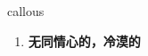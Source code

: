 
\begin{frame}
{\huge callous}
\begin{center}
\begin{enumerate}\Large
  \item \textbf{无同情心的，冷漠的}
\end{enumerate}
\end{center}
\end{frame}
